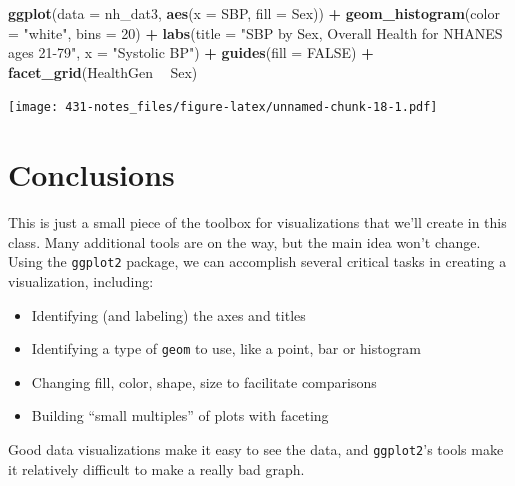 \documentclass[
]{book}
\newenvironment{Shaded}{\begin{snugshade}}{\end{snugshade}}
\newcommand{\DataTypeTok}[1]{\textcolor[rgb]{0.13,0.29,0.53}{#1}}
\newcommand{\DecValTok}[1]{\textcolor[rgb]{0.00,0.00,0.81}{#1}}
\newcommand{\KeywordTok}[1]{\textcolor[rgb]{0.13,0.29,0.53}{\textbf{#1}}}
\newcommand{\NormalTok}[1]{#1}
\newcommand{\OperatorTok}[1]{\textcolor[rgb]{0.81,0.36,0.00}{\textbf{#1}}}
\newcommand{\OtherTok}[1]{\textcolor[rgb]{0.56,0.35,0.01}{#1}}
\newcommand{\StringTok}[1]{\textcolor[rgb]{0.31,0.60,0.02}{#1}}
\providecommand{\tightlist}{%
  \setlength{\itemsep}{0pt}\setlength{\parskip}{0pt}}
\begin{document}
\begin{Shaded}
\begin{Highlighting}[]
\KeywordTok{ggplot}\NormalTok{(}\DataTypeTok{data =}\NormalTok{ nh_dat3, }\KeywordTok{aes}\NormalTok{(}\DataTypeTok{x =}\NormalTok{ SBP, }\DataTypeTok{fill =}\NormalTok{ Sex)) }\OperatorTok{+}\StringTok{ }
\StringTok{    }\KeywordTok{geom_histogram}\NormalTok{(}\DataTypeTok{color =} \StringTok{"white"}\NormalTok{, }\DataTypeTok{bins =} \DecValTok{20}\NormalTok{) }\OperatorTok{+}\StringTok{ }
\StringTok{    }\KeywordTok{labs}\NormalTok{(}\DataTypeTok{title =} \StringTok{"SBP by Sex, Overall Health for NHANES ages 21-79"}\NormalTok{,}
         \DataTypeTok{x =} \StringTok{"Systolic BP"}\NormalTok{) }\OperatorTok{+}\StringTok{ }
\StringTok{    }\KeywordTok{guides}\NormalTok{(}\DataTypeTok{fill =} \OtherTok{FALSE}\NormalTok{) }\OperatorTok{+}
\StringTok{    }\KeywordTok{facet_grid}\NormalTok{(HealthGen }\OperatorTok{~}\StringTok{ }\NormalTok{Sex)}
\end{Highlighting}
\end{Shaded}

\texttt{[image: 431-notes\_files/figure-latex/unnamed-chunk-18-1.pdf]}

\hypertarget{conclusions}{%
\section{Conclusions}\label{conclusions}}

This is just a small piece of the toolbox for visualizations that we'll create in this class. Many additional tools are on the way, but the main idea won't change. Using the \texttt{ggplot2} package, we can accomplish several critical tasks in creating a visualization, including:

\begin{itemize}
\tightlist
\item
  Identifying (and labeling) the axes and titles
\item
  Identifying a type of \texttt{geom} to use, like a point, bar or histogram
\item
  Changing fill, color, shape, size to facilitate comparisons
\item
  Building ``small multiples'' of plots with faceting
\end{itemize}

Good data visualizations make it easy to see the data, and \texttt{ggplot2}'s tools make it relatively difficult to make a really bad graph.
\end{document}
